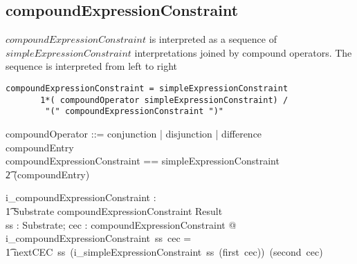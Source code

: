 \documentclass{article}
\begin{document}
\subsection{compoundExpressionConstraint}
$compoundExpressionConstraint$ is interpreted as a sequence of $simpleExpressionConstraint$ interpretations
joined by compound operators.  The sequence is interpreted from left to right
\begin{verbatim}
compoundExpressionConstraint = simpleExpressionConstraint 
       1*( compoundOperator simpleExpressionConstraint) /
        "(" compoundExpressionConstraint ")"
\end{verbatim}

\begin{zed}
compoundOperator ::= conjunction | disjunction | difference \\
compoundEntry  \\
compoundExpressionConstraint == simpleExpressionConstraint \cross \\
\t2 \seq (compoundEntry) \\
\end{zed}

\begin{gendef}
   i\_compoundExpressionConstraint : \\
\t1 Substrate \fun compoundExpressionConstraint \fun Result \\
\where
   \forall ss : Substrate; cec : compoundExpressionConstraint @ \\
    i\_compoundExpressionConstraint~ss~cec = \\
\t1 nextCEC~ss~(i\_simpleExpressionConstraint~ss~(first~cec))~(second~cec)
\end{gendef}
\end{document}

